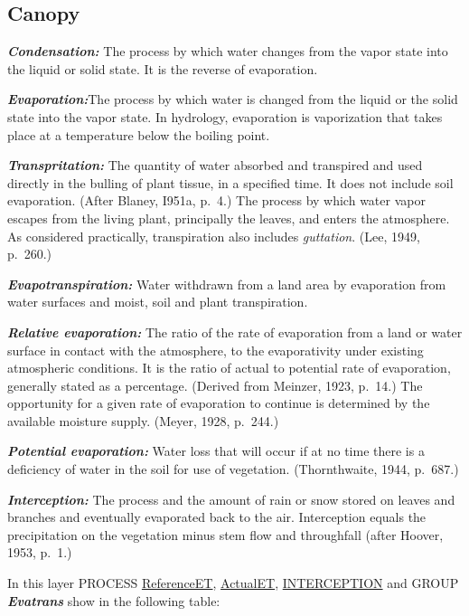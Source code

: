 \documentclass[
]{book}
\begin{document}
\hypertarget{Canopy1}{%
\subsection{Canopy}\label{Canopy1}}

\textbf{\emph{Condensation:}} The process by which water changes from the vapor state into the liquid or solid state. It is the reverse of evaporation.\citep{LANGBEIN.1960}

\textbf{\emph{Evaporation:}}The process by which water is changed from the liquid or the solid state into the vapor state. In hydrology, evaporation is vaporization that takes place at a temperature below the boiling point.\citep{LANGBEIN.1960}

\textbf{\emph{Transpritation:}} The quantity of water absorbed and transpired and used directly in the bulling of plant tissue, in a specified time. It does not include soil evaporation. (After Blaney, I951a, p.~4.) The process by which water vapor escapes from the living plant, principally the leaves, and enters the atmosphere. As considered practically, transpiration also includes \emph{guttation}. (Lee, 1949, p.~260.)

\textbf{\emph{Evapotranspiration:}} Water withdrawn from a land area by evaporation from water surfaces and moist, soil and plant transpiration.\citep{LANGBEIN.1960}

\textbf{\emph{Relative evaporation:}} The ratio of the rate of evaporation from a land or water surface in contact with the atmosphere, to the evaporativity under existing atmospheric conditions. It is the ratio of actual to potential rate of evaporation, generally stated as a percentage. (Derived from Meinzer, 1923, p.~14.) The opportunity for a given rate of evaporation to continue is determined by the available moisture supply. (Meyer, 1928, p.~244.)

\textbf{\emph{Potential evaporation:}} Water loss that will occur if at no time there is a deficiency of water in the soil for use of vegetation. (Thornthwaite, 1944, p.~687.)

\textbf{\emph{Interception:}} The process and the amount of rain or snow stored on leaves and branches and eventually evaporated back to the air. Interception equals the precipitation on the vegetation minus stem flow and throughfall (after Hoover, 1953, p.~1.)

In this layer PROCESS \protect\hyperlink{ReferenceET}{ReferenceET}, \protect\hyperlink{ActualET}{ActualET}, \protect\hyperlink{INTERCEPTION}{INTERCEPTION} and GROUP \textbf{\emph{Evatrans}} show in the following table:
\end{document}

